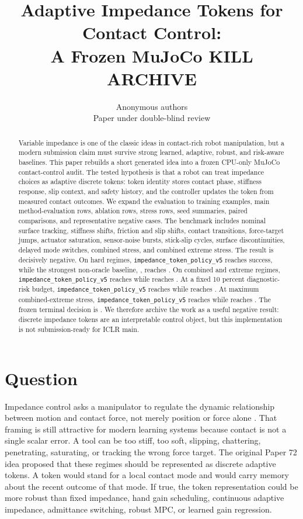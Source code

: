 \documentclass{article}
\title{Adaptive Impedance Tokens for Contact Control:\\A Frozen MuJoCo KILL ARCHIVE}
\author{Anonymous authors\\Paper under double-blind review}
\newcommand{\vfivemethod}{\texttt{impedance\_token\_policy\_v5}}
\begin{document}
\maketitle

\begin{abstract}
Variable impedance is one of the classic ideas in contact-rich robot manipulation, but a modern submission claim must survive strong learned, adaptive, robust, and risk-aware baselines.
This paper rebuilds a short generated idea into a frozen CPU-only MuJoCo contact-control audit.
The tested hypothesis is that a robot can treat impedance choices as adaptive discrete tokens: token identity stores contact phase, stiffness response, slip context, and safety history, and the controller updates the token from measured contact outcomes.
We expand the evaluation to \TrainingRows{} training examples, \MainRows{} main method-evaluation rows, \AblationRows{} ablation rows, \StressRows{} stress rows, \SeedRows{} seed summaries, \PairwiseRows{} paired comparisons, and \NegativeRows{} representative negative cases.
The benchmark includes nominal surface tracking, stiffness shifts, friction and slip shifts, contact transitions, force-target jumps, actuator saturation, sensor-noise bursts, stick-slip cycles, surface discontinuities, delayed mode switches, combined stress, and combined extreme stress.
The result is decisively negative.
On hard regimes, \vfivemethod{} reaches \VFiveHardSuccess{} success, while the strongest non-oracle baseline, \BestHardMethod{}, reaches \BestHardSuccess{}.
On combined and extreme regimes, \vfivemethod{} reaches \VFiveCombinedSuccess{} while \BestCombinedMethod{} reaches \BestCombinedSuccess{}.
At a fixed 10 percent diagnostic-risk budget, \vfivemethod{} reaches \VFiveFixedRiskSuccess{} while \BestFixedRiskMethod{} reaches \BestFixedRiskSuccess{}.
At maximum combined-extreme stress, \vfivemethod{} reaches \VFiveMaxStressSuccess{} while \BestMaxStressMethod{} reaches \BestMaxStressSuccess{}.
The frozen terminal decision is \textbf{\PaperDecision{}}.
We therefore archive the work as a useful negative result: discrete impedance tokens are an interpretable control object, but this implementation is not submission-ready for ICLR main.
\end{abstract}

\section{Question}
Impedance control asks a manipulator to regulate the dynamic relationship between motion and contact force, not merely position or force alone \citep{hogan1985impedance1,hogan1985impedance3}.
That framing is still attractive for modern learning systems because contact is not a single scalar error.
A tool can be too stiff, too soft, slipping, chattering, penetrating, saturating, or tracking the wrong force target.
The original Paper 72 idea proposed that these regimes should be represented as discrete adaptive tokens.
A token would stand for a local contact mode and would carry memory about the recent outcome of that mode.
If true, the token representation could be more robust than fixed impedance, hand gain scheduling, continuous adaptive impedance, admittance switching, robust MPC, or learned gain regression.
\end{document}
